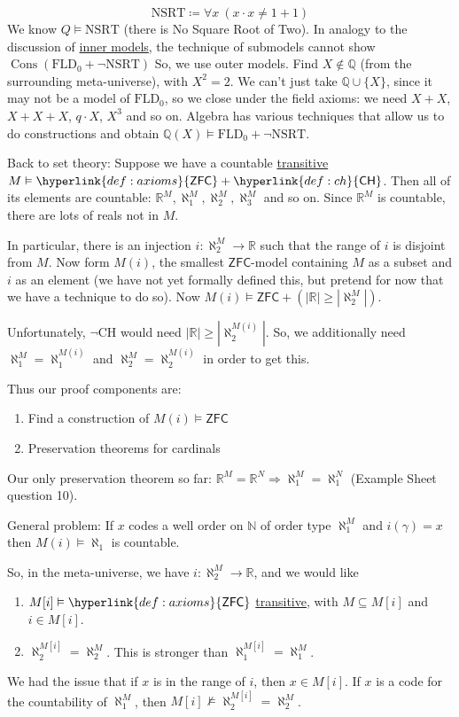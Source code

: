 \documentclass{article}
\newcommand{\1}{\mathbbm{1}}
\DeclareMathOperator{\cons}{Cons}
\let\models\vDash
\let\nModels\nvDash
\begin{document}
\begin{equation*}
  \text{NSRT} \coloneqq \forall x\ (x \cdot x \neq 1 + 1)
\end{equation*}
We know $Q \models \text{NSRT}$ (there is No Square Root of Two).
In analogy to the discussion of \hyperlink{def:innerModel}{inner models}, the technique of submodels cannot show $\cons(\text{FLD}_0 + \neg\text{NSRT})$
So, we use outer models. Find $X \notin \mathbb{Q}$ (from the surrounding meta-universe), with $X^2 = 2$.
We can't just take $\mathbb{Q} \cup \{X\}$, since it may not be a model of $\text{FLD}_0$, so we close under the field axioms: we need $X+X$, $X+X+X$, $q \cdot X$, $X^3$ and so on.
Algebra has various techniques that allow us to do constructions and obtain $\mathbb{Q}(X) \models \text{FLD}_0+\neg\text{NSRT}$.
\medskip

Back to set theory: Suppose we have a countable \hyperlink{def:transitive}{transitive} $M \models \hyperlink{def:axioms}{\textsf{ZFC}}+\hyperlink{def:ch}{\textsf{CH}}$.
Then all of its elements are countable: $\mathbb{R}^M, \aleph_1^M, \aleph_2^M, \aleph_3^M$ and so on.
Since $\mathbb{R}^M$ is countable, there are lots of reals not in $M$.

In particular, there is an injection $i: \aleph_2^M \to \mathbb{R}$ such that the range of $i$ is disjoint from $M$.
Now form $M(i)$, the smallest $\textsf{ZFC}$-model containing $M$ as a subset and $i$ as an element (we have not yet formally defined this, but pretend for now that we have a technique to do so).
Now $M(i) \models \textsf{ZFC} + (|\mathbb{R}| \geq |\aleph_2^M|)$.

Unfortunately, $\neg$\textsf{CH} would need $|\mathbb{R}| \geq |\aleph_2^{M(i)}|$.
So, we additionally need $\aleph_1^M = \aleph_1^{M(i)}$ and $\aleph_2^M = \aleph_2^{M(i)}$ in order to get this.

Thus our proof components are:
\begin{enumerate}
  \item Find a construction of $M(i) \models \textsf{ZFC}$
  \item Preservation theorems for cardinals
\end{enumerate}
Our only preservation theorem so far: $\mathbb{R}^M = \mathbb{R}^N \Rightarrow \aleph_1^M = \aleph_1^N$ (Example Sheet question 10).

General problem: If $x$ codes a well order on $\mathbb{N}$ of order type $\aleph_1^M$ and $i(\gamma) = x$ then $M(i) \models \aleph_1$ is countable.

\newlec
So, in the meta-universe, we have $i : \aleph_2^M \to \mathbb{R}$, and we would like
\begin{enumerate}
  \item $M[i] \models \hyperlink{def:axioms}{\textsf{ZFC}}$ \hyperlink{def:transitive}{transitive}, with $M \subseteq M[i]$ and $i \in M[i]$.
  \item $\aleph_2^{M[i]} = \aleph_2^M$. This is stronger than $\aleph_1^{M[i]} = \aleph_1^M$.
\end{enumerate}
We had the issue that if $x$ is in the range of $i$, then $x \in M[i]$.
If $x$ is a code for the countability of $\aleph_1^M$, then $M[i] \nModels \aleph_2^{M[i]} = \aleph_2^M$.
\end{document}
